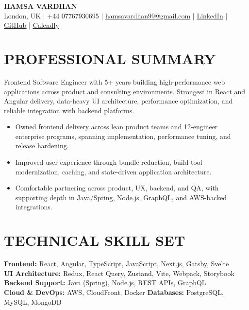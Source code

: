 \documentclass[10pt]{article}
\begin{document}
\begin{center}
{\Large \textbf{HAMSA VARDHAN}}\\[2pt]
London, UK \;|\; +44 07767930695 \;|\;
\href{mailto:hamsavardhan99@gmail.com}{hamsavardhan99@gmail.com} \;|\;
\href{https://linkedin.com/in/hamsa-vardhan}{\underline{LinkedIn}} \;|\;
\href{https://github.com/hamsa-vd}{\underline{GitHub}} \;|\;
\href{https://calendly.com/hamsa-vd/intro-call}{\underline{Calendly}}
\end{center}

\vspace{-2pt}

\section*{PROFESSIONAL SUMMARY}

Frontend Software Engineer with 5+ years building high-performance web applications across product and consulting environments. Strongest in React and Angular delivery, data-heavy UI architecture, performance optimization, and reliable integration with backend platforms.
\begin{itemize}
  \item Owned frontend delivery across lean product teams and 12-engineer enterprise programs, spanning implementation, performance tuning, and release hardening.
  \item Improved user experience through bundle reduction, build-tool modernization, caching, and state-driven application architecture.
  \item Comfortable partnering across product, UX, backend, and QA, with supporting depth in Java/Spring, Node.js, GraphQL, and AWS-backed integrations.
\end{itemize}

\section*{TECHNICAL SKILL SET}

\textbf{Frontend:} React, Angular, TypeScript, JavaScript, Next.js, Gatsby, Svelte\\
\textbf{UI Architecture:} Redux, React Query, Zustand, Vite, Webpack, Storybook\\
\textbf{Backend Support:} Java (Spring), Node.js, REST APIs, GraphQL\\
\textbf{Cloud \& DevOps:} AWS, CloudFront, Docker \quad
\textbf{Databases:} PostgreSQL, MySQL, MongoDB
\end{document}
